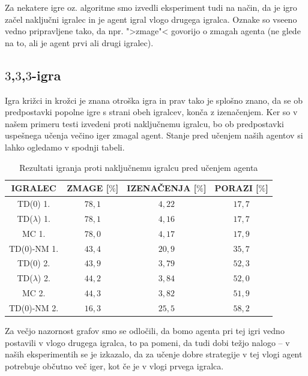 \documentclass[12pt,a4paper]{amsart}
\theoremstyle{definition} %
\theoremstyle{plain} %
\begin{document}
Za nekatere igre oz. algoritme smo izvedli eksperiment tudi na način, da je igro začel naključni igralec
in je agent igral vlogo drugega igralca. Oznake so vseeno vedno pripravljene tako, da npr. ">zmage"< 
govorijo o zmagah agenta (ne glede na to, ali je agent prvi ali drugi igralec). 

\subsection{$3$,$3$,$3$-igra}
Igra križci in krožci je znana otroška igra in prav tako je splošno znano, da se ob predpostavki 
popolne igre s strani obeh igralcev, konča z izenačenjem. Ker so v našem primeru testi izvedeni proti 
naključnemu igralcu, bo ob predpostavki uspešnega učenja večino iger zmagal agent. Stanje pred učenjem
naših agentov si lahko ogledamo v spodnji tabeli.

\begin{center}
    \begin{table}[H]
        \begin{tabular}{| c | c | c | c |}
            \hline
            IGRALEC & ZMAGE [$\%$]& IZENAČENJA [$\%$]& PORAZI [$\%$]\\
            \hline
            TD($0$) 1.&$78,1$&$4,22$&$17,7$\\
            TD($\lambda$) 1.&$78,1$&$4,16$&$17,7$\\
            MC 1.&$78,0$&$4,17$&$17,9$\\
            TD($0$)-NM 1.&$43,4$&$20,9$&$35,7$\\
            \hline
            TD($0$) 2.&$43,9$&$3,79$&$52,3$\\
            TD($\lambda$) 2.&$44,2$&$3,84$&$52,0$\\
            MC 2.&$44,3$&$3,82$&$51,9$\\
            TD($0$)-NM 2.&$16,3$&$25,5$&$58,2$\\
            \hline
    \end{tabular}
    \caption{Rezultati igranja proti naključnemu igralcu pred učenjem agenta}
    \end{table}
    \end{center}

Za večjo nazornost grafov smo se odločili, da bomo agenta pri tej igri vedno postavili v vlogo 
drugega igralca, to pa pomeni, da tudi dobi težjo nalogo -- v naših eksperimentih se je izkazalo, 
da za učenje dobre strategije v tej vlogi agent potrebuje občutno več iger, kot če je v vlogi 
prvega igralca.
\end{document}
